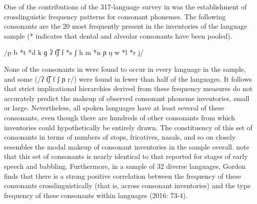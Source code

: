   One of the contributions of the 317-language survey in \citet{Maddieson1984} was the establishment of crosslinguistic frequency patterns for consonant phonemes. The following consonants are the 20 most frequently present in the inventories of the language sample (* indicates that dental and alveolar consonants have been pooled).

\ea\label{ex:(4.1)}
  /p b *t *d k ɡ ʔ t͡ʃ f *s ʃ h m *n ɲ ŋ w *l *r j/

\citep[12]{Maddieson1984}
\z

None of the consonants in  were found to occur in every language in the sample, and some (/ʔ t͡ʃ f ʃ ɲ r/) were found in fewer than half of the languages. It follows that strict implicational hierarchies derived from these frequency measures do not accurately predict the makeup of observed consonant phoneme inventories, small or large. Nevertheless, all spoken languages have at least several of these consonants, even though there are hundreds of other consonants from which inventories could hypothetically be entirely drawn. The constituency of this set of consonants in terms of numbers of stops, fricatives, nasals, and so on closely resembles the modal makeup of consonant inventories in the sample overall. \citet{LindblomMaddieson1988} note that this set of consonants is nearly identical to that reported for stages of early speech and babbling. Furthermore, in a sample of 32 diverse languages, Gordon finds that there is a strong positive correlation between the frequency of these consonants crosslinguistically (that is, across consonant inventories) and the type frequency of these consonants within languages (2016: 73-4).


